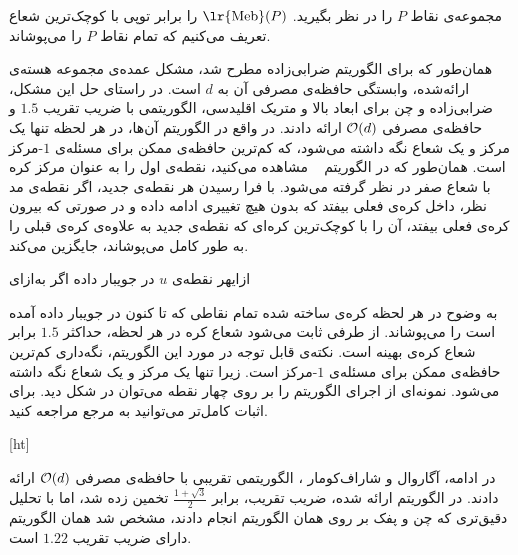 مجموعه‌ی نقاط $P$ را در نظر بگیرید. $\text{\lr{Meb}}(P)$ را برابر توپی با کوچک‌ترین شعاع تعریف می‌کنیم که تمام نقاط $P$ را می‌پوشاند.


همان‌طور که برای الگوریتم ضرابی‌زاده مطرح شد، مشکل عمده‌ی مجموعه هسته‌ی ارائه‌شده، وابستگی حافظه‌ی مصرفی آن به $d$ است.
در راستای حل این مشکل، ضرابی‌زاده و چن  برای ابعاد بالا و متریک اقلیدسی، الگوریتمی با ضریب تقریب $1.5$ و حافظه‌ی مصرفی $\mathcal{O}(d)$ ارائه دادند.
در واقع در الگوریتم آن‌ها، در هر لحظه تنها یک مرکز و یک شعاع نگه داشته می‌شود، که کم‌ترین حافظه‌ی ممکن برای مسئله‌ی $1$-مرکز است.
همان‌طور که در الگوریتم ~ مشاهده می‌کنید، نقطه‌ی اول را به عنوان مرکز کره با شعاع صفر در نظر گرفته می‌شود.
با فرا رسیدن هر نقطه‌ی جدید، اگر نقطه‌ی مد نظر، داخل کره‌ی فعلی بیفتد که بدون هیچ تغییری ادامه داده و در صورتی که بیرون کره‌ی فعلی بیفتد، آن را با کوچک‌ترین کره‌ای که نقطه‌ی جدید به علاوه‌ی کره‌ی قبلی را به طور کامل می‌پوشاند، جایگزین می‌کند. 

‌ازای{هر نقطه‌ی $u$ در جویبار داده}
‌اگر
‌به‌ازای

به وضوح در هر لحظه کره‌ی ساخته شده تمام نقاطی که تا کنون در جویبار داده آمده است را می‌پوشاند.
از طرفی ثابت می‌شود شعاع کره در هر لحظه، حداکثر $1.5$ برابر شعاع کره‌ی بهینه است.
نکته‌ی قابل توجه در مورد این الگوریتم، نگه‌داری کم‌ترین حافظه‌ی ممکن برای مسئله‌ی $1$-مرکز است.
زیرا تنها یک مرکز و یک شعاع نگه داشته می‌شود.
نمونه‌ای از اجرای الگوریتم را بر روی چهار نقطه می‌توان در شکل  دید.
برای اثبات کامل‌تر می‌توانید به مرجع  مراجعه کنید. 

[ht]


در ادامه، آگاروال و شاراف‌کومار ، الگوریتمی تقریبی با حافظه‌ی مصرفی $\mathcal{O}(d)$ ارائه دادند.
در الگوریتم ارائه شده، ضریب تقریب، برابر $\frac{1 + \sqrt{3}}{2}$  تخمین زده شد، اما با تحلیل دقیق‌تری که چن و پفک  بر روی همان الگوریتم انجام دادند، مشخص شد همان الگوریتم دارای ضریب تقریب $1.22$ است.

